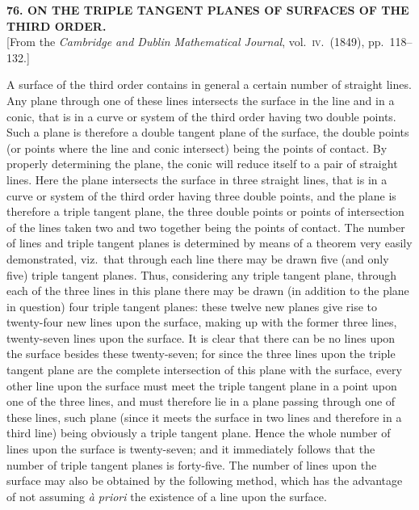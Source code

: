 \documentclass[11pt]{article}
\begin{document}
\bigskip
\begin{center}
\textbf{76. ON THE TRIPLE TANGENT PLANES OF SURFACES OF THE THIRD ORDER.}\\[2pt]
[From the \textit{Cambridge and Dublin Mathematical Journal}, vol.~\textsc{iv}.\ (1849), pp.~118--132.]
\end{center}

A surface of the third order contains in general a certain number of straight lines. Any plane through one of these lines intersects the surface in the line and in a conic, that is in a curve or system of the third order having two double points. Such a plane is therefore a double tangent plane of the surface, the double points (or points where the line and conic intersect) being the points of contact. By properly determining the plane, the conic will reduce itself to a pair of straight lines. Here the plane intersects the surface in three straight lines, that is in a curve or system of the third order having three double points, and the plane is therefore a triple tangent plane, the three double points or points of intersection of the lines taken two and two together being the points of contact. The number of lines and triple tangent planes is determined by means of a theorem very easily demonstrated, viz.\ that through each line there may be drawn five (and only five) triple tangent planes. Thus, considering any triple tangent plane, through each of the three lines in this plane there may be drawn (in addition to the plane in question) four triple tangent planes: these twelve new planes give rise to twenty-four new lines upon the surface, making up with the former three lines, twenty-seven lines upon the surface. It is clear that there can be no lines upon the surface besides these twenty-seven; for since the three lines upon the triple tangent plane are the complete intersection of this plane with the surface, every other line upon the surface must meet the triple tangent plane in a point upon one of the three lines, and must therefore lie in a plane passing through one of these lines, such plane (since it meets the surface in two lines and therefore in a third line) being obviously a triple tangent plane. Hence the whole number of lines upon the surface is twenty-seven; and it immediately follows that the number of triple tangent planes is forty-five. The number of lines upon the surface may also be obtained by the following method, which has the advantage of not assuming \textit{\`a priori} the existence of a line upon the surface.
\end{document}
